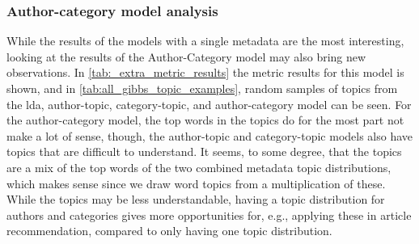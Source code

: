 \subsubsection*{Author-category model analysis}
While the results of the models with a single metadata are the most interesting, looking at the results of the Author-Category model may also bring new observations.
In \autoref{tab:_extra_metric_results} the metric results for this model is shown, and in \autoref{tab:all_gibbs_topic_examples}, random samples of topics from the \gls{lda}, author-topic, category-topic, and author-category model can be seen.
For the author-category model, the top words in the topics do for the most part not make a lot of sense, though, the author-topic and category-topic models also have topics that are difficult to understand.
It seems, to some degree, that the topics are a mix of the top words of the two combined metadata topic distributions, which makes sense since we draw word topics from a multiplication of these.
While the topics may be less understandable, having a topic distribution for authors and categories gives more opportunities for, e.g., applying these in article recommendation, compared to only having one topic distribution.
